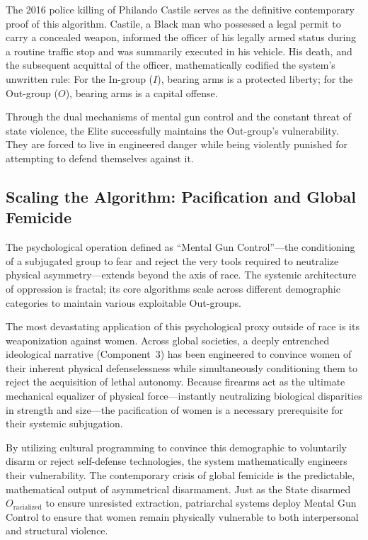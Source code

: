 The 2016 police killing of Philando Castile serves as the definitive contemporary proof of this algorithm. Castile, a Black man who possessed a legal permit to carry a concealed weapon, informed the officer of his legally armed status during a routine traffic stop and was summarily executed in his vehicle. His death, and the subsequent acquittal of the officer, mathematically codified the system's unwritten rule: For the In-group ($I$), bearing arms is a protected liberty; for the Out-group ($O$), bearing arms is a capital offense.

Through the dual mechanisms of mental gun control and the constant threat of state violence, the Elite successfully maintains the Out-group's vulnerability. They are forced to live in engineered danger while being violently punished for attempting to defend themselves against it.

\subsection{Scaling the Algorithm: Pacification and Global Femicide}

The psychological operation defined as ``Mental Gun Control''---the conditioning of a subjugated group to fear and reject the very tools required to neutralize physical asymmetry---extends beyond the axis of race. The systemic architecture of oppression is fractal; its core algorithms scale across different demographic categories to maintain various exploitable Out-groups.

The most devastating application of this psychological proxy outside of race is its weaponization against women. Across global societies, a deeply entrenched ideological narrative (Component~3) has been engineered to convince women of their inherent physical defenselessness while simultaneously conditioning them to reject the acquisition of lethal autonomy. Because firearms act as the ultimate mechanical equalizer of physical force---instantly neutralizing biological disparities in strength and size---the pacification of women is a necessary prerequisite for their systemic subjugation.

By utilizing cultural programming to convince this demographic to voluntarily disarm or reject self-defense technologies, the system mathematically engineers their vulnerability. The contemporary crisis of global femicide is the predictable, mathematical output of asymmetrical disarmament. Just as the State disarmed $O_{\text{racialized}}$ to ensure unresisted extraction, patriarchal systems deploy Mental Gun Control to ensure that women remain physically vulnerable to both interpersonal and structural violence.

